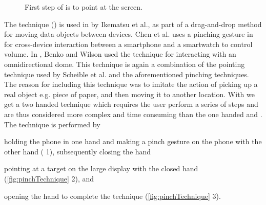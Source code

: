 \begin{figure}[H]
\caption{
	\protect{} First step of \throw is to point at the screen.
}
\label{fig:throwTechnique}
\end{figure}

The \pinch technique () is used in \cite{Ikematsu:2015} by Ikematsu et al., as part of a drag-and-drop method for moving data objects between devices.
Chen et al. uses a pinching gesture in \cite{Chen:2014} for cross-device interaction between a smartphone and a smartwatch to control volume. 
In \cite{Benko:2010}, Benko and Wilson used the \pinch technique for interacting with an omnidirectional dome.
This technique is again a combination of the pointing technique used by Scheible et al. and the aforementioned pinching techniques. 
The reason for including this technique was to imitate the action of picking up a real object e.g. piece of paper, and then moving it to another location.
With \pinch we get a two handed technique which requires the user perform a series of steps and are thus considered more complex and time consuming  than the one handed \swipe and \tilt.
The \pinch technique is performed by 
\begin{enumerate*}[label=\itshape\roman*\upshape)]
	\item{holding the phone in one hand and making a pinch gesture on the phone with the other hand ( 1), subsequently closing the hand}
	\item{pointing at a target on the large display with the closed hand (\cref{fig:pinchTechnique} 2), and}
	\item{opening the hand to complete the technique (\cref{fig:pinchTechnique} 3).}
\end{enumerate*}

